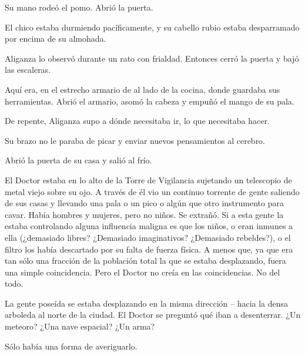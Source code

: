 Su mano rodeó el pomo. Abrió la puerta.

El chico estaba durmiendo pacíficamente, y su cabello rubio estaba desparramado por encima de su almohada.

Aliganza lo observó durante un rato con frialdad. Entonces cerró la puerta y bajó las escaleras.

Aquí era, en el estrecho armario de al lado de la cocina, donde guardaba sus herramientas. Abrió el armario, asomó la cabeza y empuñó el mango de su pala.

De repente, Aliganza supo a dónde necesitaba ir, lo que necesitaba hacer.

Su brazo no le paraba de picar y enviar nuevos pensamientos al cerebro.

Abrió la puerta de su casa y salió al frío.



\mbox{}



\centerline{ \Huge *}



\mbox{}



El Doctor estaba en lo alto de la Torre de Vigilancia sujetando un telescopio de metal viejo sobre su ojo. A través de él vio un continuo torrente de gente saliendo de sus casas y llevando una pala o un pico o algún que otro instrumento para cavar. Había hombres y mujeres, pero no niños. Se extrañó. Si a esta gente la estaba controlando alguna influencia maligna es que los niños, o eran inmunes a ella (¿demasiado libres? ¿Demasiado imaginativos? ¿Demasiado rebeldes?), o el filtro los había descartado por su falta de fuerza física. A menos que, ya que era tan sólo una fracción de la población total la que se estaba desplazando, fuera una simple coincidencia. Pero el Doctor no creía en las coincidencias. No del todo.

La gente poseída se estaba desplazando en la misma dirección – hacia la densa arboleda al norte de la ciudad. El Doctor se preguntó qué iban a desenterrar. ¿Un meteoro? ¿Una nave espacial? ¿Un arma? 

Sólo había una forma de averiguarlo.



\mbox{}



\centerline{ \Huge *}



\mbox{}



